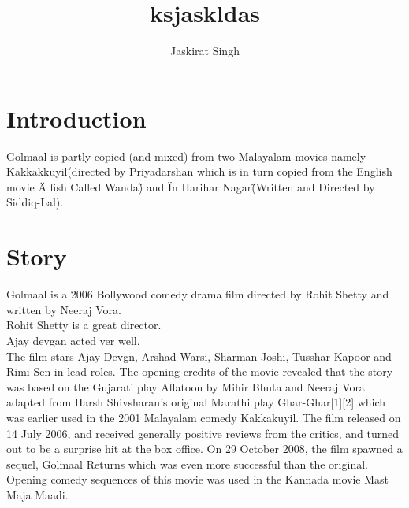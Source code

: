 \documentclass[a4paper,10pt]{article}
\title{ksjaskldas}
\author{Jaskirat Singh}
\begin{document}
\maketitle

\section{Introduction}
Golmaal is partly-copied (and mixed) from two Malayalam movies namely \"Kakkakkuyil\" (directed by Priyadarshan which is in turn copied from the English movie \"A fish Called Wanda\") and \"In Harihar Nagar\" (Written and Directed by Siddiq-Lal).
\section{Story}
Golmaal is a 2006 Bollywood comedy drama film directed by Rohit Shetty and written by Neeraj Vora.\\
Rohit Shetty is a great director.\\

Ajay devgan acted ver well.\\
The film stars Ajay Devgn, Arshad Warsi, Sharman Joshi, Tusshar Kapoor and Rimi Sen in lead roles. 
The opening credits of the movie revealed that the story was based on the Gujarati play Aflatoon by Mihir Bhuta and Neeraj Vora adapted from Harsh Shivsharan's original Marathi play Ghar-Ghar[1][2] which was earlier used in the 2001 Malayalam comedy Kakkakuyil. The film released on 14 July 2006, and received generally positive reviews from the critics, and turned out to be a surprise hit at the box office. On 29 October 2008, the film spawned a sequel, Golmaal Returns which was even more successful than the original. Opening comedy sequences of this movie was used in the Kannada movie Mast Maja Maadi.
\end{document}

